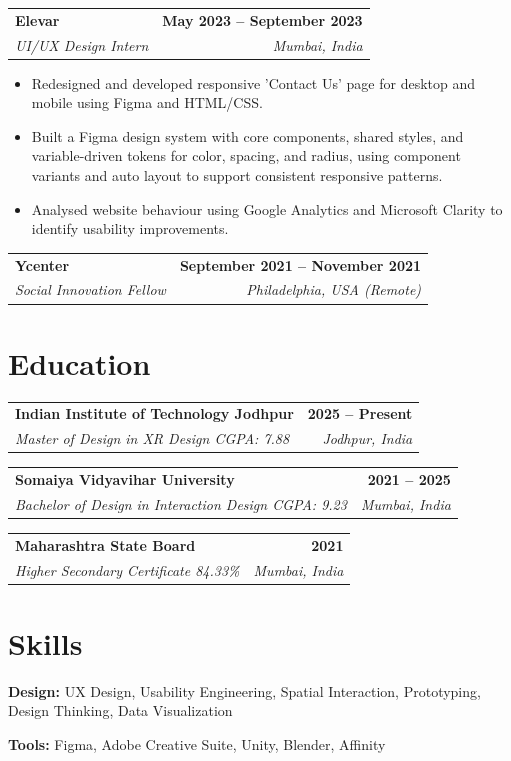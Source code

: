 \documentclass[a4paper,10.5pt]{article}
\makeatletter
\newcommand{\resumeEntry}[4]{
    \begin{tabularx}{\textwidth}{@{}X r@{}}
        \textbf{\color{headingcolor}#1} & \textbf{#4} \\
        \textit{#3} & \textit{#2}
    \end{tabularx}
    \vspace{1pt}
}
\newcommand{\resumeListStart}{
    \begin{itemize}
}
\newcommand{\resumeListEnd}{
    \end{itemize}
    \vspace{3pt}
}
\makeatother
\begin{document}
\resumeEntry
    {Elevar}
    {Mumbai, India}
    {UI/UX Design Intern}
    {May 2023 -- September 2023}

\resumeListStart
    \item Redesigned and developed responsive 'Contact Us' page for desktop and mobile using Figma and HTML/CSS.
    \item Built a Figma design system with core components, shared styles, and variable-driven tokens for color, spacing, and radius, using component variants and auto layout to support consistent responsive patterns.
    \item Analysed website behaviour using Google Analytics and Microsoft Clarity to identify usability improvements.
\resumeListEnd

\resumeEntry
    {Ycenter}
    {Philadelphia, USA (Remote)}
    {Social Innovation Fellow}
    {September 2021 -- November 2021}

\resumeListStart
\resumeListEnd

\section{Education}

\resumeEntry
    {Indian Institute of Technology Jodhpur}
    {Jodhpur, India}
    {Master of Design in XR Design \textbar{} CGPA: 7.88}
    {2025 -- Present}

\vspace{5pt}

\resumeEntry
    {Somaiya Vidyavihar University}
    {Mumbai, India}
    {Bachelor of Design in Interaction Design \textbar{} CGPA: 9.23}
    {2021 -- 2025}

\vspace{5pt}

\resumeEntry
    {Maharashtra State Board}
    {Mumbai, India}
    {Higher Secondary Certificate \textbar{} 84.33\%}
    {2021}

\section{Skills}

\textbf{Design:}
UX Design, Usability Engineering, Spatial Interaction, Prototyping, Design Thinking, Data Visualization

\vspace{4pt}

\textbf{Tools:}
Figma, Adobe Creative Suite, Unity, Blender, Affinity
\end{document}
